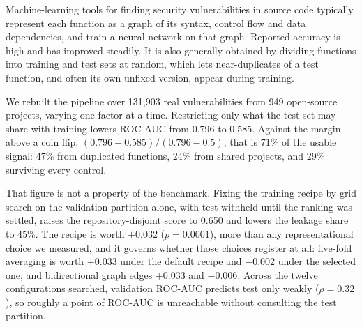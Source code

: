 Machine-learning tools for finding security vulnerabilities in source code
typically represent each function as a graph of its syntax, control flow and
data dependencies, and train a neural network on that graph. Reported accuracy
is high and has improved steadily. It is also generally obtained by dividing
functions into training and test sets at random, which lets near-duplicates of
a test function, and often its own unfixed version, appear during training.

We rebuilt the pipeline over 131,903 real vulnerabilities from 949 open-source
projects, varying one factor at a time. Restricting only what the test set may
share with training lowers ROC-AUC from 0.796 to 0.585. Against the margin
above a coin flip, $(0.796-0.585)/(0.796-0.5)$, that is 71\% of the usable
signal: 47\% from duplicated functions, 24\% from shared projects, and 29\%
surviving every control.

That figure is not a property of the benchmark. Fixing the training recipe by
grid search on the validation partition alone, with test withheld until the
ranking was settled, raises the repository-disjoint score to 0.650 and lowers
the leakage share to 45\%. The recipe is worth $+0.032$ ($p=0.0001$), more than
any representational choice we measured, and it governs whether those choices
register at all: five-fold averaging is worth $+0.033$ under the default recipe
and $-0.002$ under the selected one, and bidirectional graph edges $+0.033$ and
$-0.006$. Across the twelve configurations searched, validation ROC-AUC predicts
test only weakly ($\rho=0.32$), so roughly a point of ROC-AUC is unreachable
without consulting the test partition.
